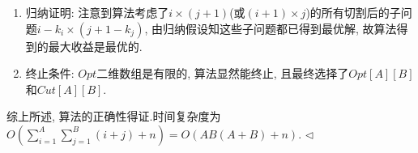 \documentclass[11pt]{article}
\newenvironment{answer}[1][Answer]{\begin{trivlist}
\item[\hskip \labelsep{\bfseries\itshape#1.}\hskip \labelsep]}{\hfill$\lhd$\end{trivlist}}
\begin{document}
\begin{answer}
\begin{enumerate}
    \item 归纳证明: 注意到算法考虑了$i \times (j+1)$(或$(i+1) \times j$)的所有切割后的子问题$i-k_i\times (j+1 - k_j)$, 由归纳假设知这些子问题都已得到最优解, 故算法得到的最大收益是最优的.
    \item 终止条件: $Opt$二维数组是有限的, 算法显然能终止, 且最终选择了$Opt[A][B]$和$Cut[A][B]$.
\end{enumerate}
综上所述, 算法的正确性得证.时间复杂度为$O\left(\sum_{i=1}^{A}\sum_{j=1}^{B} (i + j) + n\right) = O(AB(A+B) + n)$.
\end{answer}
\end{document}
